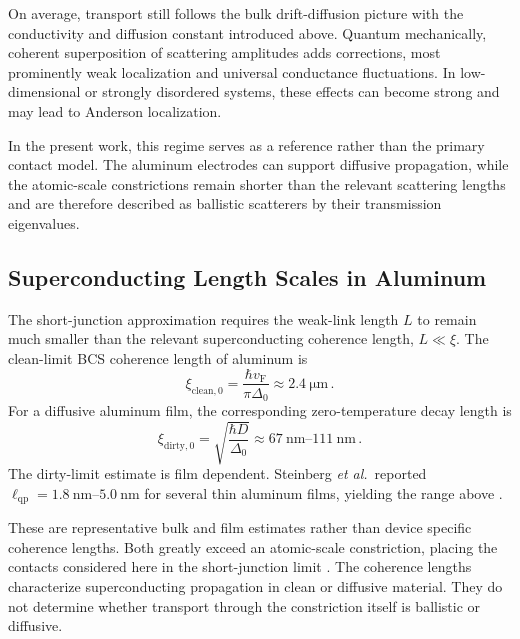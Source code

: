         On average, transport still follows the bulk drift-diffusion picture with the conductivity and diffusion constant introduced above. Quantum mechanically, coherent superposition of scattering amplitudes adds corrections, most prominently weak localization and universal conductance fluctuations. In low-dimensional or strongly disordered systems, these effects can become strong and may lead to Anderson localization. \cite{bergmann_weak_1984,lee_universal_1985,lee_disordered_1985,anderson_absence_1958,schertel_magnetic-field_2019}

        In the present work, this regime serves as a reference rather than the primary contact model. The aluminum electrodes can support diffusive propagation, while the atomic-scale constrictions remain shorter than the relevant scattering lengths and are therefore described as ballistic scatterers by their transmission eigenvalues.

    \subsection*{Superconducting Length Scales in Aluminum}
    \label{app:theory:aluminum-length-scales}

        The short-junction approximation requires the weak-link length $L$ to remain much smaller than the relevant superconducting coherence length, $L\ll\xi$. The clean-limit BCS coherence length of aluminum is
        \begin{equation}
            \xi_{\mathrm{clean}, 0} = \frac{\hbar v_\mathrm{F}}{\pi\Delta_0}\approx \qty{2.4}{\micro\meter}\,.
        \end{equation}
        For a diffusive aluminum film, the corresponding zero-temperature decay length is
        \begin{equation}
            \xi_{\mathrm{dirty},0}
            = \sqrt{\frac{\hbar D}{\Delta_0}}\approx \qtyrange{67}{111}{\nano\meter}\,.
        \end{equation}
        The dirty-limit estimate is film dependent. Steinberg \textit{et al.}~reported \(\ell_\mathrm{qp}=\qtyrange{1.8}{5.0}{\nano\meter}\) for several thin aluminum films, yielding the range above \cite{steinberg_quasi-particle_2008}.

        These are representative bulk and film estimates rather than device specific coherence lengths. Both greatly exceed an atomic-scale constriction, placing the contacts considered here in the short-junction limit \cite{scheer_conduction_1997}. The coherence lengths characterize superconducting propagation in clean or diffusive material. They do not determine whether transport through the constriction itself is ballistic or diffusive.

